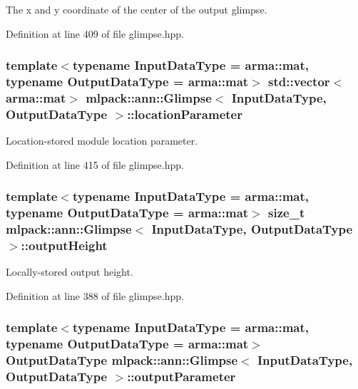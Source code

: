 The x and y coordinate of the center of the output glimpse. 



Definition at line 409 of file glimpse.\+hpp.

\subsubsection[{location\+Parameter}]{\setlength{\rightskip}{0pt plus 5cm}template$<$typename Input\+Data\+Type  = arma\+::mat, typename Output\+Data\+Type  = arma\+::mat$>$ std\+::vector$<$arma\+::mat$>$ {\bf mlpack\+::ann\+::\+Glimpse}$<$ Input\+Data\+Type, Output\+Data\+Type $>$\+::location\+Parameter\hspace{0.3cm}{\ttfamily [private]}}\label{classmlpack_1_1ann_1_1Glimpse_a47c0a75b6bc8bb0d0c54d90ba3b90fef}


Location-\/stored module location parameter. 



Definition at line 415 of file glimpse.\+hpp.

\subsubsection[{output\+Height}]{\setlength{\rightskip}{0pt plus 5cm}template$<$typename Input\+Data\+Type  = arma\+::mat, typename Output\+Data\+Type  = arma\+::mat$>$ size\+\_\+t {\bf mlpack\+::ann\+::\+Glimpse}$<$ Input\+Data\+Type, Output\+Data\+Type $>$\+::output\+Height\hspace{0.3cm}{\ttfamily [private]}}\label{classmlpack_1_1ann_1_1Glimpse_a4a25b4cd3590229cbe230359e158511d}


Locally-\/stored output height. 



Definition at line 388 of file glimpse.\+hpp.

\subsubsection[{output\+Parameter}]{\setlength{\rightskip}{0pt plus 5cm}template$<$typename Input\+Data\+Type  = arma\+::mat, typename Output\+Data\+Type  = arma\+::mat$>$ Output\+Data\+Type {\bf mlpack\+::ann\+::\+Glimpse}$<$ Input\+Data\+Type, Output\+Data\+Type $>$\+::output\+Parameter\hspace{0.3cm}{\ttfamily [private]}}\label{classmlpack_1_1ann_1_1Glimpse_a8303b4140c33371d5941b394944b19b3}


